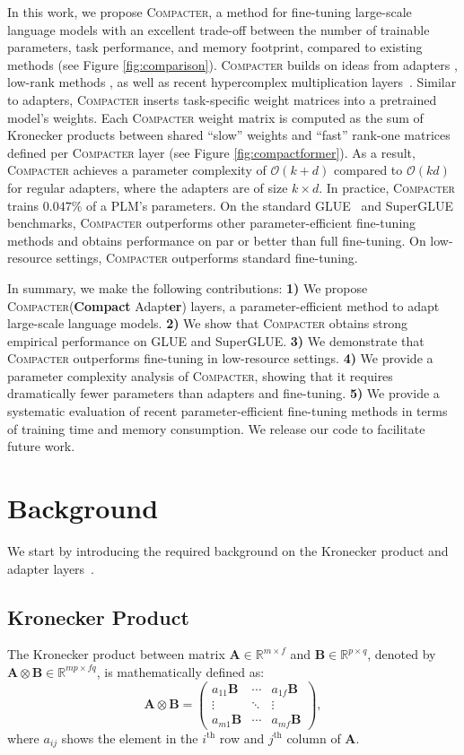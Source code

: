 \documentclass{article}
\newcommand{\compacter}{\textsc{Compacter}\xspace}
\begin{document}
In this work, we propose \compacter, a method for fine-tuning large-scale language models with an excellent trade-off between the number of trainable parameters, task performance, and memory footprint, compared to existing methods (see Figure \ref{fig:comparison}). \compacter builds on ideas from adapters \citep{houlsby2019parameter}, low-rank methods \citep{li2018measuring}, as well as recent hypercomplex multiplication layers~\citep{zhang2021beyond}. Similar to adapters, \compacter inserts task-specific weight matrices into a pretrained model's weights. Each \compacter weight matrix is computed as the sum of Kronecker products between shared ``slow'' weights and ``fast'' rank-one matrices defined per \compacter layer (see Figure \ref{fig:compactformer}). As a result, \compacter achieves a parameter complexity of $\mathcal{O}(k+d)$ compared to $\mathcal{O}(kd)$ for regular adapters, where the adapters are of size $k\!{\times}\! d$. In practice, \compacter trains $0.047\%$ of a PLM's parameters. On the standard GLUE~\citep{wang2018glue} and SuperGLUE~\citep{wang2019superglue} benchmarks, \compacter outperforms other parameter-efficient fine-tuning methods and obtains performance on par or better than full fine-tuning. On low-resource settings, \compacter outperforms standard fine-tuning. 

In summary, we make the following contributions:
\textbf{1)} We propose \compacter (\textbf{Compact} Adapt\textbf{er}) layers, a parameter-efficient method to adapt large-scale language models. 
\textbf{2)} We show that \compacter obtains strong empirical performance on GLUE and SuperGLUE. 
\textbf{3)} We demonstrate that \compacter outperforms fine-tuning in low-resource settings.
\textbf{4)} We provide a parameter complexity analysis of \compacter, showing that it requires dramatically fewer parameters than adapters and fine-tuning.
\textbf{5)} We provide a systematic evaluation of recent parameter-efficient fine-tuning methods in terms of training time and memory consumption. We release our code to facilitate future work.


\section{Background}
We start by introducing the required background on the Kronecker product and adapter layers~\citep{houlsby2019parameter, rebuffi2018efficient}. 
\subsection{Kronecker Product} 
The Kronecker product between matrix $\bm{A}\in \mathbb{R}^{m\times f}$ and $\bm{B} \in \mathbb{R}^{p\times q}$, denoted by $\bm{A}\otimes \bm{B} \in \mathbb{R}^{mp\times fq}$, is mathematically defined as:
\begin{equation}
\bm{A}\otimes\bm{B} =   \begin{pmatrix}
a_{11}\bm{B}  & \cdots & a_{1f}\bm{B} \\
\vdots  & \ddots & \vdots  \\
a_{m1}\bm{B}  & \cdots & a_{mf}\bm{B} 
\end{pmatrix},
\end{equation} where $a_{ij}$ shows the element in the $i^\text{th}$ row and $j^\text{th}$ column of $\bm{A}$. 
\end{document}

